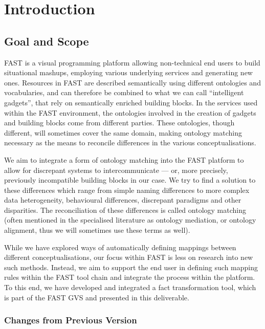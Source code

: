 \documentclass{fast_latex}
\begin{document}
\clearpage
{}


\section{Introduction} %
\label{sec:intro}
\subsection{Goal and Scope}
FAST is a visual programming platform allowing non-technical end users to build situational mashups, employing various underlying services and generating new ones. Resources in FAST are described semantically using different ontologies and vocabularies, and can therefore be combined to what we can call ``intelligent gadgets'', that rely on semantically enriched building blocks. In the services used within the FAST environment, the ontologies involved in the creation of gadgets and building blocks come from different parties. These ontologies, though different, will sometimes cover the same domain, making ontology matching necessary as the means to reconcile differences in the various conceptualisations.

We aim to integrate a form of ontology matching into the FAST platform to allow for discrepant systems to intercommunicate --- or, more precisely, previously incompatible building blocks in our case.  We try to find a solution to these differences which range from simple naming differences to more complex data heterogeneity, behavioural differences, discrepant paradigms and other disparities. The reconciliation of these differences is called ontology matching (often mentioned in the specialised literature as ontology mediation, or ontology alignment, thus we will sometimes use these terms as well). 

While we have explored ways of automatically defining mappings between different conceptualisations, our focus within FAST is less on research into new such methods. Instead, we aim to support the end user in defining such mapping rules within the FAST tool chain and integrate the process within the platform. To this end, we have developed and integrated a fact transformation tool, which is part of the FAST GVS and presented in this deliverable.

\subsubsection{Changes from Previous Version}
\end{document}
